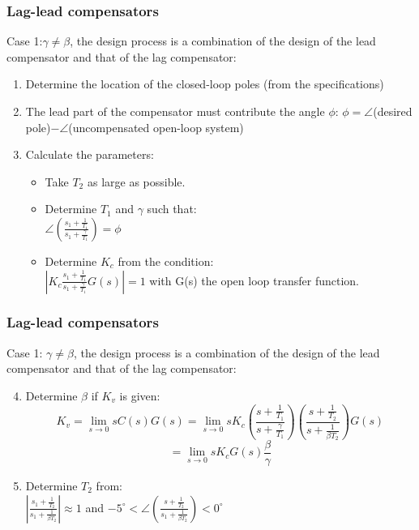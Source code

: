 \begin{frame}
	\frametitle{Lag-lead compensators}
	Case 1:$\gamma\neq \beta$,  the design process is a combination of the design of the lead compensator and that of the lag compensator:
	\begin{enumerate}
		\item Determine the location of the closed-loop poles (from the specifications)
		\item The lead part of the compensator must contribute the angle $\phi$: $\phi=\angle$(desired pole)$-\angle$(uncompensated open-loop system)
		\item Calculate the parameters:
		\begin{itemize}
			\item Take $T_2$ as large as possible.
			\item Determine $T_1$ and $\gamma$ such that:\\ 
			$\angle(\frac{s_1+\frac{1}{T_1}}{s_1+\frac{\gamma}{T_1}})=\phi$
			\item Determine $K_c$ from the condition:\\
			$|K_c\frac{s_1+\frac{1}{T_1}}{s_1+\frac{\gamma}{T_1}}G(s)|=1$ with G(s) the open loop transfer function.
		\end{itemize}
	\end{enumerate}
\end{frame}

\begin{frame}
	\frametitle{Lag-lead compensators}
	Case 1: $\gamma\neq \beta$,  the design process is a combination of the design of the lead compensator and that of the lag compensator:
	\begin{enumerate}
		\setcounter{enumi}{3}
		\item Determine $\beta$ if $K_v$ is given:
		$$K_v=\lim_{s\to0}sC(s)G(s)=\lim_{s\to 0}sK_c(\frac{s+\frac{1}{T_1}}{s+\frac{\gamma}{T_1}})
		(\frac{s+\frac{1}{T_2}}{s+\frac{1}{\beta T_2}})G(s)$$
		$$=\lim_{s\to0}sK_cG(s)\frac{\beta}{\gamma}$$
		\item Determine $T_2$ from:\\
		$|\frac{s_1+\frac{1}{T_2}}{s_1+\frac{1}{\beta T_2}}|\approx 1$ and $-5^{\circ}<\angle(\frac{s+\frac{1}{T_2}}{s_1+\frac{1}{\beta T_2}})<0^{\circ}$
	\end{enumerate}
\end{frame}

